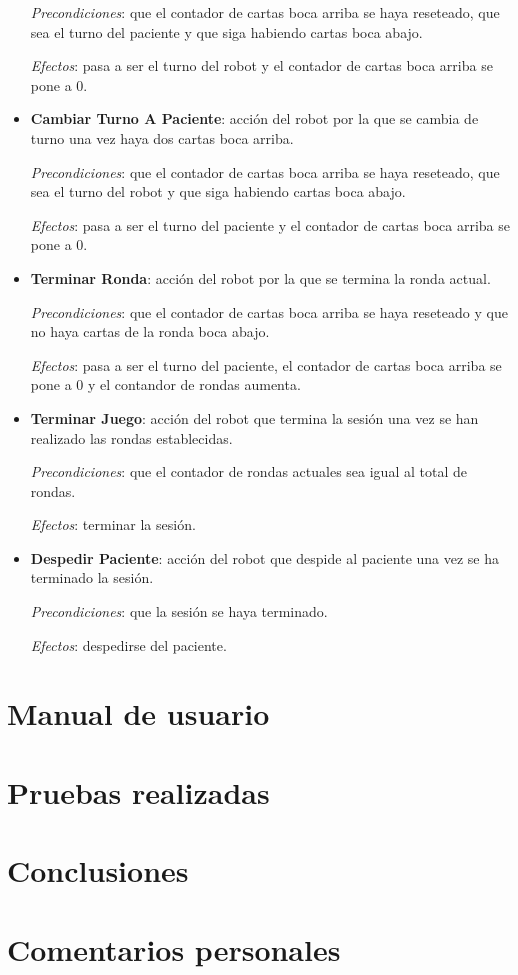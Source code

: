 \documentclass{uc3mpracticas}
\begin{document}
\begin{itemize}
      \textit{Precondiciones}: que el contador de cartas boca arriba se haya reseteado, que sea el turno del paciente y que siga habiendo cartas boca abajo.

      \textit{Efectos}: pasa a ser el turno del robot y el contador de cartas boca arriba se pone a 0.

    \item \textbf{Cambiar Turno A Paciente}: acción del robot por la que se cambia de turno una vez haya dos cartas boca arriba.

      \textit{Precondiciones}: que el contador de cartas boca arriba se haya reseteado, que sea el turno del robot y que siga habiendo cartas boca abajo.

      \textit{Efectos}: pasa a ser el turno del paciente y el contador de cartas boca arriba se pone a 0.

    \item \textbf{Terminar Ronda}: acción del robot por la que se termina la ronda actual.

      \textit{Precondiciones}: que el contador de cartas boca arriba se haya reseteado y que no haya cartas de la ronda boca abajo.

      \textit{Efectos}: pasa a ser el turno del paciente, el contador de cartas boca arriba se pone a 0 y el contandor de rondas aumenta.

    \item \textbf{Terminar Juego}: acción del robot que termina la sesión una vez se han realizado las rondas establecidas.

      \textit{Precondiciones}: que el contador de rondas actuales sea igual al total de rondas.

      \textit{Efectos}: terminar la sesión.

    \item \textbf{Despedir Paciente}: acción del robot que despide al paciente una vez se ha terminado la sesión.

      \textit{Precondiciones}: que la sesión se haya terminado.

      \textit{Efectos}: despedirse del paciente.


  \end{itemize}









  \section{Manual de usuario}


  \section{Pruebas realizadas}


  \section{Conclusiones}


  \section{Comentarios personales}
\end{document}
